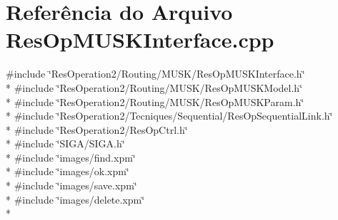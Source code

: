 \section{Referência do Arquivo Res\+Op\+M\+U\+S\+K\+Interface.\+cpp}
\label{_res_op_m_u_s_k_interface_8cpp}
{\ttfamily \#include \char`\"{}Res\+Operation2/\+Routing/\+M\+U\+S\+K/\+Res\+Op\+M\+U\+S\+K\+Interface.\+h\char`\"{}}\\*
{\ttfamily \#include \char`\"{}Res\+Operation2/\+Routing/\+M\+U\+S\+K/\+Res\+Op\+M\+U\+S\+K\+Model.\+h\char`\"{}}\\*
{\ttfamily \#include \char`\"{}Res\+Operation2/\+Routing/\+M\+U\+S\+K/\+Res\+Op\+M\+U\+S\+K\+Param.\+h\char`\"{}}\\*
{\ttfamily \#include \char`\"{}Res\+Operation2/\+Tecniques/\+Sequential/\+Res\+Op\+Sequential\+Link.\+h\char`\"{}}\\*
{\ttfamily \#include \char`\"{}Res\+Operation2/\+Res\+Op\+Ctrl.\+h\char`\"{}}\\*
{\ttfamily \#include \char`\"{}S\+I\+G\+A/\+S\+I\+G\+A.\+h\char`\"{}}\\*
{\ttfamily \#include \char`\"{}images/find.\+xpm\char`\"{}}\\*
{\ttfamily \#include \char`\"{}images/ok.\+xpm\char`\"{}}\\*
{\ttfamily \#include \char`\"{}images/save.\+xpm\char`\"{}}\\*
{\ttfamily \#include \char`\"{}images/delete.\+xpm\char`\"{}}\\*

